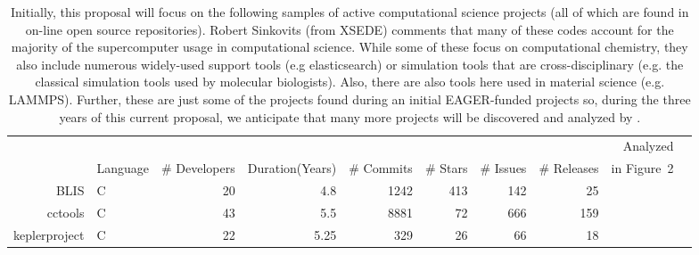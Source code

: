 \begin{table}
\caption{Initially,
this proposal will focus on the following
 samples of active computational science projects
(all of which are found in on-line open source repositories). 
{\normalfont Robert Sinkovits (from XSEDE) comments that many of these codes account for the majority of the supercomputer usage in computational
science. While some of these  focus on  computational chemistry,  they   also   include  numerous widely-used support tools (e.g
elasticsearch) or simulation tools that are cross-disciplinary (e.g. the classical simulation tools
used  by molecular biologists).  Also, there are also tools here used in material science (e.g. LAMMPS).
Further, these are just some of the projects found during an initial EAGER-funded projects so, during the three years of
this current proposal, we anticipate that many more projects will be discovered and analyzed by {\IT}.}
}\label{tbl:samples}
{\footnotesize
\begin{center}
\begin{tabular}{r|l@{~}rrr@{~}r@{~}r@{~}rrc}
\renewcommand{\baselinestretch}{0.7}
&   &   &   &   &  &  &   & Analyzed\\  
 & Language & \# Developers & Duration(Years) & \# Commits & \# Stars & \# Issues & \# Releases & in Figure~2\\ 
\hline
BLIS & C & 20 & 4.8 & 1242 & 413 & 142 & 25 &   \\ 
cctools & C	 & 43	& 5.5 & 8881	& 72 & 666 & 159  &   \\
keplerproject & C & 22	& 5.25 & 329 & 26 & 66	& 18 &   \\


\end{tabular}
\end{center}}
\end{table}
